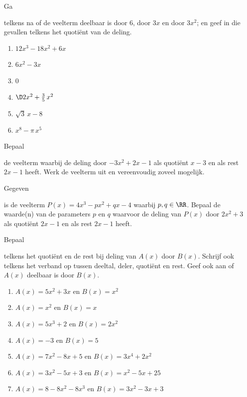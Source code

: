 \documentclass{ximera}
\begin{document}
\begin{Oefening}\setcounter{enumi}{2} 
\hypertarget{oef2.2}{Ga} telkens na of de veelterm deelbaar is door $6$, door $3x$ en door $3x^2$; en geef in die gevallen telkens het quoti\"ent van de deling.
\begin{multicols}{2}
\begin{enumerate}

\item
$12x^3-18x^2+6x$
\item
$6x^2-3x$
\item
$0$
\item
$\D 2x^2+\frac{3}{5}\,x^2$
\item
$\sqrt{3}\,x-8$
\item
$x^8-\pi\,x^5$
\end{enumerate}
\end{multicols}
\end{Oefening}

\begin{Oefening}\setcounter{enumi}{3} 
\hypertarget{oef2.3}{Bepaal} de veelterm waarbij de deling door $-3x^2+2x-1$ als quoti\"ent $x-3$ en als rest $2x-1$ heeft. Werk de veelterm uit en vereenvoudig zoveel mogelijk.
\end{Oefening}

\begin{Oefening}\setcounter{enumi}{4}  
\hypertarget{oef2.4}{Gegeven} is de veelterm $P(x) = 4x^3 - px^2 + qx - 4$ waarbij $p,q \in \RR$. Bepaal de waarde(n) van de parameters $p$ en $q$ waarvoor de deling van $P(x)$ door $2x^2+3$ als quoti\"ent $2x-1$ en als rest $2x-1$ heeft. 
\end{Oefening}

\begin{Oefening}\setcounter{enumi}{5} 
\hypertarget{oef2.5}{Bepaal} telkens het quoti\"ent en de rest bij deling van $A(x)$ door $B(x)$. Schrijf ook telkens het verband op tussen deeltal, deler, quoti\"ent en rest. Geef ook aan of $A(x)$ deelbaar is door $B(x)$.
\begin{enumerate}
\item
$A(x) = 5x^2 + 3x$ \quad en \quad $B(x) = x^2$
\item
$A(x) = x^2$ \quad en \quad $B(x) = x$
\item
$A(x) = 5x^3+2$ \quad en \quad $B(x) = 2x^2$
\item
$A(x) = -3$ \quad en \quad $B(x) = 5$
\item
$A(x) = 7x^2-8x+5$ \quad en \quad $B(x) = 3x^4+2x^2$
\item
$A(x) = 3x^2 - 5x + 3$ \quad en \quad $B(x) = x^2 - 5x + 25$ 
\item
$A(x) = 8-8x^2-8x^3$ \quad en \quad $B(x) = 3x^2 - 3x + 3$ 
\end{enumerate}
\end{Oefening}
\end{document}

